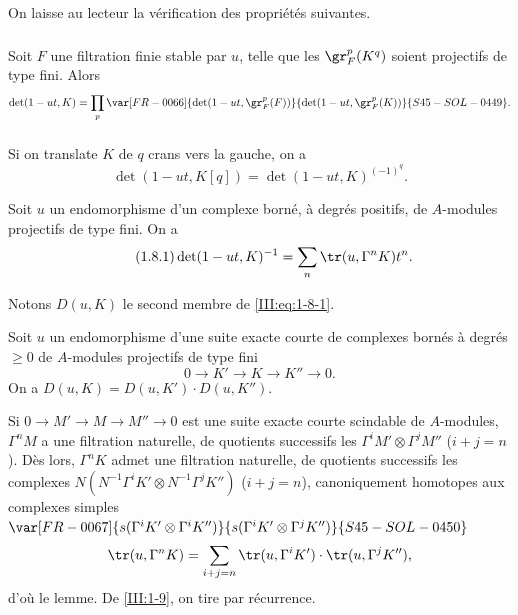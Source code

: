 On laisse au lecteur la vérification des propriétés suivantes. 


\subsubsection{}\label{III:1-7-1}

Soit $F$ une filtration finie stable par $u$, telle que les $\gr_F^p(K^q)$ 
soient projectifs de type fini. Alors 
\[
  \det(1-u t,K) = \prod_p \var[FR-0066]{\det(1-u t,\gr_F^p(F))}{\det(1-u t,\gr_F^p(K))}{S45-SOL-0449} \text{.}
\]


\subsubsection{}\label{III:1-7-2}

Si on translate $K$ de $q$ crans vers la gauche, on a 
\[
  \det(1-u t,K[q]) = \det(1-u t,K)^{(-1)^q} \text{.}
\]





\begin{proposition_}\label{III:1-8}
Soit $u$ un endomorphisme d'un complexe borné, à degrés positifs, de 
$A$-modules projectifs de type fini. On a \
\begin{equation*}\tag{1.8.1}\label{III:eq:1-8-1}
  \det(1-u t,K)^{-1} = \sum_n \tr(u,\Gamma^n K) t^n \text{.}
\end{equation*}
\end{proposition_}

Notons $D(u,K)$ le second membre de \eqref{III:eq:1-8-1}. 





\begin{lemma_}\label{III:1-9}
Soit $u$ un endomorphisme d'une suite exacte courte de complexes bornés à 
degrés $\geqslant 0$ de $A$-modules projectifs de type fini 
\[
  0 \to K' \to K \to K'' \to 0 \text{.}
\]
On a $D(u,K)=D(u,K')\cdot D(u,K'')$.
\end{lemma_}

Si $0\to M'\to M\to M''\to 0$ est une suite exacte courte scindable de 
$A$-modules, $\Gamma^n M$ a une filtration naturelle, de quotients successifs 
les $\Gamma^i M'\otimes \Gamma^j M''$ ($i+j=n$). Dès lors, $\Gamma^n K$ admet 
une filtration naturelle, de quotients successifs les complexes 
$N(N^{-1} \Gamma^i K'\otimes N^{-1}\Gamma^j K'')$ ($i+j=n$), canoniquement 
homotopes aux complexes simples $\var[FR-0067]{s(\Gamma^i K'\otimes \Gamma^i K'')}{s(\Gamma^i K'\otimes \Gamma^j K'')}{S45-SOL-0450}$   
\[
  \tr(u,\Gamma^n K) = \sum_{i+j=n} \tr(u,\Gamma^i K')\cdot \tr(u,\Gamma^j K'') \text{,}
\]
d'où le lemme. De \ref{III:1-9}, on tire par récurrence. 





